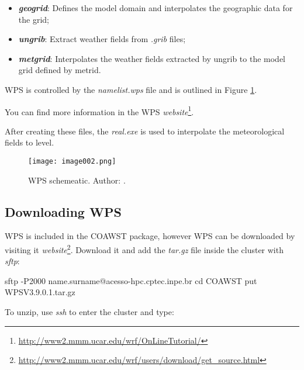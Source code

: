 \begin{itemize}
\item \textbf{\textit{geogrid}}: Defines the model domain and interpolates the geographic data for the grid;
\item \textbf{\textit{ungrib}}: Extract weather fields from \textit{.grib} files;
\item \textbf{\textit{metgrid}}: Interpolates the weather fields extracted by ungrib to the model grid defined by metrid.
\end{itemize}
\bigskip

\noindent WPS is controlled by the \textit{namelist.wps} file and is outlined in Figure \textcolor{bleu_cite}{\ref{wpsdetalha}}.
\bigskip

\noindent You can find more information in the WPS 
\textcolor{bleu_cite}{\textit{website}\footnote{\textcolor{bleu_cite}{\href{http://www2.mmm.ucar.edu/wrf/OnLineTutorial/}{http://www2.mmm.ucar.edu/wrf/OnLineTutorial/}}}}.
\bigskip

\noindent After creating these files, the \textit{real.exe} is used to interpolate the meteorological fields to \texteta level.
\bigskip

\begin{figure}[H]
    \centering
    \texttt{[image: image002.png]}
    \caption{WPS schemeatic. \newline Author: \textcite{duda2006}.}
    \label{wpsdetalha}
\end{figure}
\bigskip

\subsection{Downloading WPS}
\bigskip

\noindent WPS is included in the COAWST package, however WPS can be downloaded by visiting it
\textcolor{bleu_cite}{\textit{website}\footnote{\textcolor{bleu_cite}{\href{http://www2.mmm.ucar.edu/wrf/users/download/get\_source.html}{http://www2.mmm.ucar.edu/wrf/users/download/get\_source.html}}}}. 
Download it and add the \textit{tar.gz} file inside the cluster with \textit{sftp}:
\bigskip

\begin{bashcode}
sftp -P2000 name.surname@acesso-hpc.cptec.inpe.br
cd COAWST
put WPSV3.9.0.1.tar.gz
\end{bashcode}
\bigskip

\noindent To unzip, use \textit{ssh} to enter the cluster and type:
\bigskip


